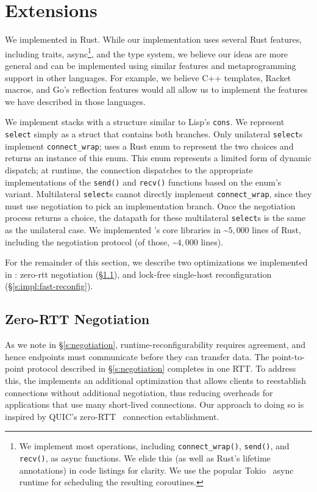 \section{\name Extensions}\label{s:impl}
We implemented \name in Rust. While our implementation uses several Rust features, including traits, async\footnote{
We implement most \tunnel operations, including \texttt{connect\_wrap()}, \texttt{send()}, and \texttt{recv()}, as async functions. We elide this (as well as Rust's lifetime annotations) in code listings for clarity. We use the popular Tokio~\cite{tokio-rs} async runtime for scheduling the resulting coroutines.
}, and the type system, we believe our ideas are more general and can be implemented using similar features and metaprogramming support in other languages. 
For example, we believe C++ templates, Racket macros, and Go's reflection features would all allow us to implement the features we have described in those languages.

We implement \tunnel stacks with a structure similar to Lisp's \texttt{cons}. We represent \texttt{select} simply as a struct that contains both branches. 
Only unilateral \texttt{select}s implement \texttt{connect\_wrap}; \name uses a Rust enum to represent the two choices and returns an instance of this enum.
This enum represents a limited form of dynamic dispatch; at runtime, the connection dispatches to the appropriate implementations of the \texttt{send()} and \texttt{recv()} functions based on the enum's variant.
Multilateral \texttt{select}s cannot directly implement \texttt{connect\_wrap}, since they must use negotiation to pick an implementation branch.
Once the negotiation process returns a choice, the datapath for these multilateral \texttt{select}s is the same as the unilateral case.
We implemented \name's core libraries in \textasciitilde$5,000$ lines of Rust, including the negotiation protocol (of those, \textasciitilde$4,000$ lines).

For the remainder of this section, we describe two optimizations we implemented in \name: zero-rtt negotiation (\S\ref{s:impl:zerortt}), and lock-free single-host reconfiguration (\S\ref{s:impl:fast-reconfig}).

\subsection{Zero-RTT Negotiation}\label{s:impl:zerortt}
As we note in \S\ref{s:negotiation}, runtime-reconfigurability requires agreement, and hence endpoints must communicate before they can transfer data. The point-to-point protocol described in \S\ref{s:negotiation} completes in one RTT. 
To address this, the \name implements an additional optimization that allows clients to reestablish connections without additional negotiation, thus reducing overheads for applications that use many short-lived connections. Our approach to doing so is inspired by QUIC's zero-RTT~\cite{quic} connection establishment.

